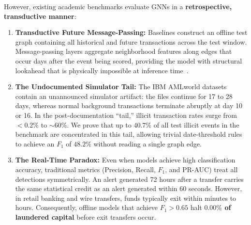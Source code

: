 \documentclass[10pt,twocolumn,letterpaper]{article}
\begin{document}
However, existing academic benchmarks evaluate GNNs in a \textbf{retrospective, transductive manner}:
\begin{enumerate}[leftmargin=*]
    \item \textbf{Transductive Future Message-Passing:} Baselines construct an offline test graph containing all historical and future transactions across the test window. Message-passing layers aggregate neighborhood features along edges that occur days after the event being scored, providing the model with structural lookahead that is physically impossible at inference time~\cite{nguyen2022future}.
    \item \textbf{The Undocumented Simulator Tail:} The IBM AMLworld datasets~\cite{altman2023ibmaml} contain an unannounced simulator artifact: the files continue for 17 to 28 days, whereas normal background transactions terminate abruptly at day 10 or 16. In the post-documentation ``tail,'' illicit transaction rates surge from $<0.2\%$ to $\sim60\%$. We prove that up to $40.7\%$ of all test illicit events in the benchmark are concentrated in this tail, allowing trivial date-threshold rules to achieve an $F_1$ of $48.2\%$ without reading a single graph edge.
    \item \textbf{The Real-Time Paradox:} Even when models achieve high classification accuracy, traditional metrics (Precision, Recall, $F_1$, and PR-AUC) treat all detections symmetrically. An alert generated 72 hours after a transfer carries the same statistical credit as an alert generated within 60 seconds. However, in retail banking and wire transfers, funds typically exit within minutes to hours. Consequently, offline models that achieve $F_1 > 0.65$ halt \textbf{$0.00\%$ of laundered capital} before exit transfers occur.
\end{enumerate}
\end{document}
